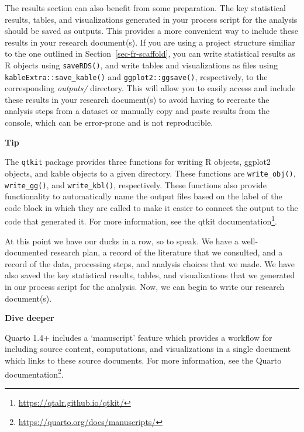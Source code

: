 \documentclass[
  letterpaper,
]{latex/krantz}
\theoremstyle{definition}
\theoremstyle{remark}
\DeclareRobustCommand{\href}[2]{#2\footnote{\url{#1}}}
\begin{document}
The results section can also benefit from some preparation. The key
statistical results, tables, and visualizations generated in your
process script for the analysis should be saved as outputs. This
provides a more convenient way to include these results in your research
document(s). If you are using a project structure similiar to the one
outlined in Section~\ref{sec-fr-scaffold}, you can write statistical
results as R objects using \texttt{saveRDS()}, and write tables and
visualizations as files using \texttt{kableExtra::save\_kable()} and
\texttt{ggplot2::ggsave()}, respectively, to the corresponding
\emph{outputs/} directory. This will allow you to easily access and
include these results in your research document(s) to avoid having to
recreate the analysis steps from a dataset or manually copy and paste
results from the console, which can be error-prone and is not
reproducible.

\begin{tcolorbox}[enhanced jigsaw, toprule=.15mm, breakable, colback=white, opacityback=0, leftrule=.75mm, bottomrule=.15mm, colframe=quarto-callout-color-frame, left=2mm, arc=.35mm, rightrule=.15mm]

\textbf{ Tip}

The \texttt{qtkit} package provides three functions for writing R
objects, ggplot2 objects, and kable objects to a given directory. These
functions are \texttt{write\_obj()}, \texttt{write\_gg()}, and
\texttt{write\_kbl()}, respectively. These functions also provide
functionality to automatically name the output files based on the label
of the code block in which they are called to make it easier to connect
the output to the code that generated it. For more information, see the
\href{https://qtalr.github.io/qtkit/}{qtkit documentation}.

\end{tcolorbox}

At this point we have our ducks in a row, so to speak. We have a
well-documented research plan, a record of the literature that we
consulted, and a record of the data, processing steps, and analysis
choices that we made. We have also saved the key statistical results,
tables, and visualizations that we generated in our process script for
the analysis. Now, we can begin to write our research document(s).

\begin{tcolorbox}[enhanced jigsaw, toprule=.15mm, breakable, colback=white, opacityback=0, leftrule=.75mm, bottomrule=.15mm, colframe=quarto-callout-color-frame, left=2mm, arc=.35mm, rightrule=.15mm]

\textbf{ Dive deeper}

Quarto 1.4+ includes a `manuscript' feature which provides a workflow
for including source content, computations, and visualizations in a
single document which links to these source documents. For more
information, see the \href{https://quarto.org/docs/manuscripts/}{Quarto
documentation}.

\end{tcolorbox}
\end{document}

